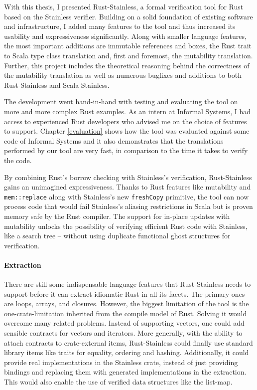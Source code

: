 With this thesis, I presented Rust-Stainless, a formal verification tool for
Rust based on the Stainless verifier. Building on a solid foundation of existing
software and infrastructure, I added many features to the tool and thus
increased its usability and expressiveness significantly. Along with smaller
language features, the most important additions are immutable references and
boxes, the Rust trait to Scala type class translation and, first and foremost,
the mutability translation. Further, this project includes the theoretical
reasoning behind the correctness of the mutability translation as well as
numerous bugfixes and additions to both Rust-Stainless and Scala Stainless.

The development went hand-in-hand with testing and evaluating the tool on more
and more complex Rust examples. As an intern at Informal Systems, I had access
to experienced Rust developers who advised me on the choice of features to
support. Chapter \ref{evaluation} shows how the tool was evaluated against some
code of Informal Systems and it also demonstrates that the translations
performed by our tool are very fast, in comparison to the time it takes to
verify the code.

By combining Rust's borrow checking with Stainless's verification,
Rust-Stainless gains an unimagined expressiveness. Thanks to Rust features like
mutability and \lstinline!mem::replace! along with Stainless's new
\lstinline!freshCopy! primitive, the tool can now process code that would fail
Stainless's aliasing restrictions in Scala but is proven memory safe by the Rust
compiler. The support for in-place updates with mutability unlocks the
possibility of verifying efficient Rust code with Stainless, like a search tree
-- without using duplicate functional ghost structures for verification.


\paragraph{Extraction}

There are still some indispensable language features that Rust-Stainless needs
to support before it can extract idiomatic Rust in all its facets. The primary
ones are loops, arrays, and closures. However, the biggest limitation of the
tool  is the one-crate-limitation inherited from the compile model of Rust.
Solving it would overcome many related problems. Instead of supporting vectors,
one could add sensible contracts for vectors and iterators. More generally, with
the ability to attach contracts to crate-external items, Rust-Stainless could
finally  use standard library items like traits for equality, ordering and
hashing. Additionally, it could provide real implementations in the Stainless
crate, instead of just providing bindings and replacing them with generated
implementations in the extraction. This would also enable the use of verified
data structures like the list-map.

